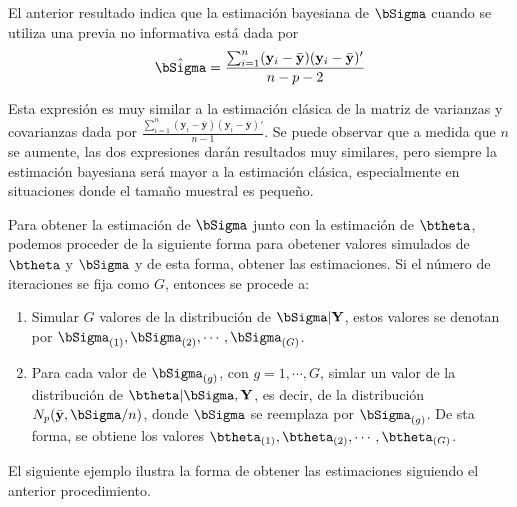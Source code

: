 El anterior resultado indica que la estimación bayesiana de $\bSigma$ cuando se utiliza una previa no informativa está dada por 
\begin{equation*}
\hat{\bSigma}=\frac{\sum_{i=1}^n(\mathbf{y}_i-\bar{\mathbf{y}})(\mathbf{y}_i-\bar{\mathbf{y}})'}{n-p-2}
\end{equation*}

Esta expresión es muy similar a la estimación clásica de la matriz de varianzas y covarianzas dada por $\frac{\sum_{i=1}^n(\mathbf{y}_i-\bar{\mathbf{y}})(\mathbf{y}_i-\bar{\mathbf{y}})'}{n-1}$. Se puede observar que a medida que $n$ se aumente, las dos expresiones darán resultados muy similares, pero siempre la estimación bayesiana será mayor a la estimación clásica, especialmente en situaciones donde el tamaño muestral es pequeño.

Para obtener la estimación de $\bSigma$ junto con la estimación de $\btheta$, podemos proceder de la siguiente forma para obetener valores simulados de $\btheta$ y $\bSigma$ y de esta forma, obtener las estimaciones. Si el número de iteraciones se fija como $G$, entonces se procede a:
\begin{enumerate}[(1)]
\item Simular $G$ valores de la distribución de $\bSigma|\mathbf{Y}$, estos valores se denotan por $\bSigma_{(1)},\bSigma_{(2)},\cdots,\bSigma_{(G)}$.
\item  Para cada valor de $\bSigma_{(g)}$, con $g=1,\cdots,G$, simlar un valor de la distribución de $\btheta|\bSigma,\mathbf{Y}$, es decir, de la distribución $N_p(\bar{\mathbf{y}}, \bSigma/n)$, donde $\bSigma$ se reemplaza por $\bSigma_{(g)}$. De sta forma, se obtiene los valores $\btheta_{(1)},\btheta_{(2)},\cdots,\btheta_{(G)}$.
\end{enumerate}

El siguiente ejemplo ilustra la forma de obtener las estimaciones siguiendo el anterior procedimiento. 

